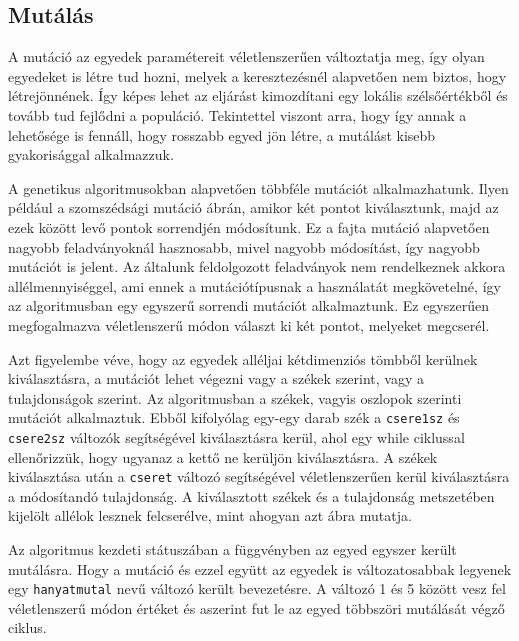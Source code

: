 \documentclass[12pt,a4paper,oneside]{report}
\begin{document}
        \subsection{Mutálás} %
           		 A mutáció az egyedek paramétereit véletlenszerűen változtatja meg, így olyan egyedeket is létre tud hozni, melyek a keresztezésnél alapvetően nem biztos, hogy létrejönnének. Így képes lehet az eljárást kimozdítani egy lokális szélsőértékből és tovább tud fejlődni a 		populáció. Tekintettel viszont arra, hogy így annak a lehetősége is fennáll, hogy rosszabb egyed jön létre, a mutálást kisebb gyakorisággal alkalmazzuk. 
		
	
	A genetikus algoritmusokban alapvetően többféle mutációt alkalmazhatunk. Ilyen például a szomszédsági mutáció   ábrán, amikor két pontot kiválasztunk, majd az ezek között levő pontok sorrendjén módosítunk. Ez a fajta mutáció alapvetően nagyobb feladványoknál hasznosabb, 		mivel nagyobb módosítást, így nagyobb mutációt is jelent. Az általunk feldolgozott feladványok nem rendelkeznek akkora allélmennyiséggel, ami ennek a mutációtípusnak a használatát megkövetelné, így az algoritmusban egy egyszerű sorrendi mutációt alkalmaztunk. Ez 		egyszerűen megfogalmazva véletlenszerű módon választ ki két pontot, melyeket megcserél.

		
	Azt figyelembe véve, hogy az egyedek alléljai kétdimenziós tömbből kerülnek kiválasztásra, a mutációt lehet végezni vagy a székek szerint, vagy a tulajdonságok szerint. Az algoritmusban a székek, vagyis oszlopok szerinti mutációt alkalmaztuk.
	Ebből kifolyólag egy-egy darab szék a \texttt{csere1sz} és \texttt{csere2sz} változók segítségével kiválasztásra kerül, ahol egy while ciklussal ellenőrizzük, hogy ugyanaz a kettő ne kerüljön kiválasztásra. A székek kiválasztása után a \texttt{cseret} változó segítségével véletlenszerűen kerül kiválasztásra a módosítandó tulajdonság. A kiválasztott székek és a tulajdonság metszetében kijelölt allélok lesznek felcserélve, mint ahogyan azt   ábra mutatja.
	
		
	Az algoritmus kezdeti státuszában a függvényben az egyed egyszer került mutálásra. Hogy a mutáció és ezzel együtt az egyedek is változatosabbak legyenek egy \texttt{hanyatmutal} nevű változó került bevezetésre. A változó 1 és 5 között vesz fel véletlenszerű módon értéket 		és aszerint fut le az egyed többszöri mutálását végző ciklus.
	
\end{document}
